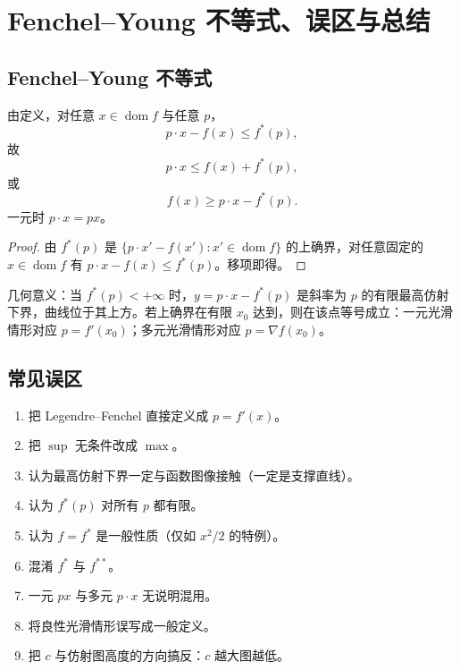 \documentclass[
    lang=cn,
    color=blue,
    mode=fancy,
    thmcnt=section,
    scheme=chinese,
    chinesefont=ctexfont
]{elegantbook}
\DeclareMathOperator{\dom}{dom}
\newcommand{\fstar}{f^{\ast}}
\newcommand{\fstarp}{f^{\ast}(p)}
\begin{document}
\chapter{Fenchel--Young 不等式、误区与总结}

\section{Fenchel--Young 不等式}

\begin{theorem}
由定义，对任意 $x\in\dom f$ 与任意 $p$，
\[
p\cdot x-f(x)\le\fstarp,
\]
故
\[
p\cdot x\le f(x)+\fstarp,
\]
或
\[
f(x)\ge p\cdot x-\fstarp.
\]
一元时 $p\cdot x=px$。
\end{theorem}

\begin{proof}
由 $\fstarp$ 是 $\{p\cdot x'-f(x'):x'\in\dom f\}$ 的上确界，对任意固定的 $x\in\dom f$ 有 $p\cdot x-f(x)\le\fstarp$。移项即得。
\end{proof}

几何意义：当 $\fstarp<+\infty$ 时，$y=p\cdot x-\fstarp$ 是斜率为 $p$ 的有限最高仿射下界，曲线位于其上方。若上确界在有限 $x_{0}$ 达到，则在该点等号成立：一元光滑情形对应 $p=f'(x_{0})$；多元光滑情形对应 $p=\nabla f(x_{0})$。


\section{常见误区}

\begin{remark}
\begin{enumerate}
  \item 把 Legendre--Fenchel 直接定义成 $p=f'(x)$。
  \item 把 $\sup$ 无条件改成 $\max$。
  \item 认为最高仿射下界一定与函数图像接触（一定是支撑直线）。
  \item 认为 $\fstarp$ 对所有 $p$ 都有限。
  \item 认为 $f=\fstar$ 是一般性质（仅如 $x^{2}/2$ 的特例）。
  \item 混淆 $f^{\ast}$ 与 $f^{\ast\ast}$。
  \item 一元 $px$ 与多元 $p\cdot x$ 无说明混用。
  \item 将良性光滑情形误写成一般定义。
  \item 把 $c$ 与仿射图高度的方向搞反：$c$ 越大图越低。
\end{enumerate}
\end{remark}
\end{document}
